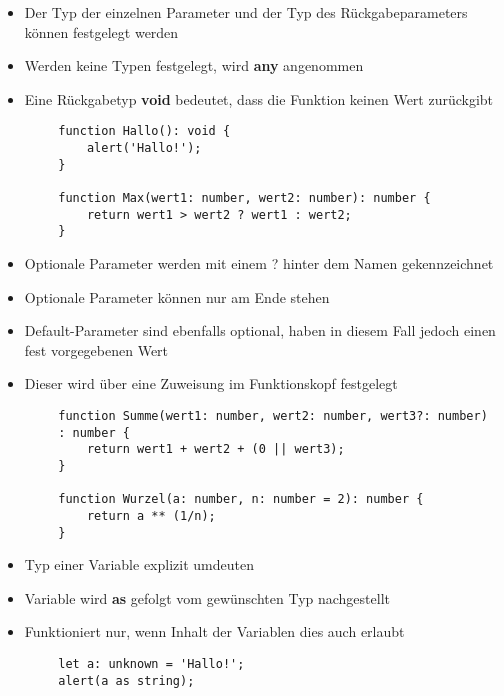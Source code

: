 \documentclass[10pt]{article}
\begin{document}
    \begin{tcolorbox}[
    colback=Orange!5!white,
    colframe=Orange!75!black,
    title={\centering Funktionen}]
    \begin{itemize}
        \item Der Typ der einzelnen Parameter und der Typ des Rückgabeparameters können festgelegt werden
        \item Werden keine Typen festgelegt, wird \textbf{any} angenommen
        \item Eine Rückgabetyp \textbf{void} bedeutet, dass die Funktion keinen Wert zurückgibt
    \end{itemize}
    \begin{lstlisting}
        function Hallo(): void {
            alert('Hallo!');
        }

        function Max(wert1: number, wert2: number): number {
            return wert1 > wert2 ? wert1 : wert2;
        }
    \end{lstlisting}
    \begin{itemize}
        \item Optionale Parameter werden mit einem ? hinter dem Namen gekennzeichnet
        \item Optionale Parameter können nur am Ende stehen
        \item Default-Parameter sind ebenfalls optional, haben in diesem Fall jedoch einen fest vorgegebenen Wert
        \item Dieser wird über eine Zuweisung im Funktionskopf festgelegt
    \end{itemize}
    \begin{lstlisting}
        function Summe(wert1: number, wert2: number, wert3?: number)
        : number {
            return wert1 + wert2 + (0 || wert3);
        }

        function Wurzel(a: number, n: number = 2): number {
            return a ** (1/n);
        }
    \end{lstlisting}
    \end{tcolorbox}

    \begin{tcolorbox}[
    colback=Red!5!white,
    colframe=Red!75!black,
    title={\centering Casting}]
    \begin{itemize}
        \item Typ einer Variable explizit umdeuten
        \item Variable wird \textbf{as} gefolgt vom gewünschten Typ nachgestellt
        \item Funktioniert nur, wenn Inhalt der Variablen dies auch erlaubt
    \end{itemize}
    \begin{lstlisting}
        let a: unknown = 'Hallo!';
        alert(a as string);
    \end{lstlisting}
    \end{tcolorbox}
\end{document}
